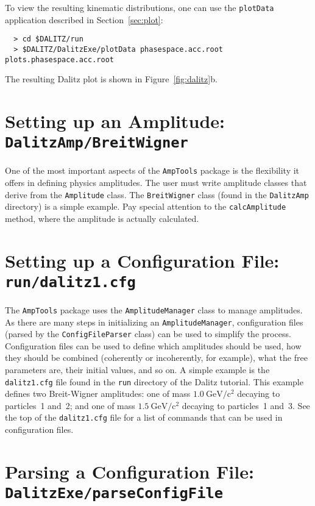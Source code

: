 \documentclass[10pt]{article}
\newcommand{\gevcc}{\mathrm{GeV/c^2}}
\begin{document}
To view the resulting kinematic distributions, one can use the {\tt plotData} application described in Section~\ref{sec:plot}:
\begin{verbatim}
  > cd $DALITZ/run
  > $DALITZ/DalitzExe/plotData phasespace.acc.root plots.phasespace.acc.root
\end{verbatim}
The resulting Dalitz plot is shown in Figure~\ref{fig:dalitz}b.


\section{Setting up an Amplitude: \\
{\tt DalitzAmp/BreitWigner}}
\label{sec:bw}

One of the most important aspects of the {\tt AmpTools} package is the flexibility it offers in defining physics amplitudes.  The user must write amplitude classes that derive from the {\tt Amplitude} class.  The {\tt BreitWigner} class (found in the {\tt DalitzAmp} directory) is a simple example.  Pay special attention to the {\tt calcAmplitude} method, where the amplitude is actually calculated.

\section{Setting up a Configuration File: \\
{\tt run/dalitz1.cfg}}
\label{sec:config}



The {\tt AmpTools} package uses the {\tt AmplitudeManager} class to manage amplitudes.  As there are many steps in initializing an {\tt AmplitudeManager}, configuration files (parsed by the {\tt ConfigFileParser} class) can be used to simplify the process.  Configuration files can be used to define which amplitudes should be used, how they should be combined (coherently or incoherently, for example), what the free parameters are, their initial values, and so on.  A simple example is the {\tt dalitz1.cfg} file found in the {\tt run} directory of the Dalitz tutorial.  This example defines two Breit-Wigner amplitudes: one of mass $1.0~\gevcc$ decaying to particles~1 and~2; and one of mass $1.5~\gevcc$ decaying to particles~1 and~3.  See the top of the {\tt dalitz1.cfg} file for a list of commands that can be used in configuration files.

\section{Parsing a Configuration File: \\
{\tt DalitzExe/parseConfigFile}}
\end{document}
